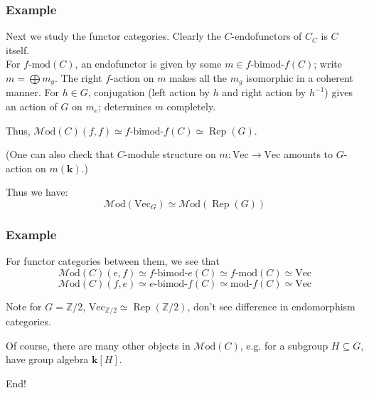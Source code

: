\documentclass{beamer}
\newcommand{\kk}{{\mathbf{k}}}
\newcommand{\ZZ}{{\mathbb{Z}}}
\DeclareMathOperator{\Rep}{Rep}
\newcommand{\inv}{{-1}} %
\newcommand{\Vect}{{\textrm{Vec}}}
\newcommand{\bimod}[2]{{#1\textrm{-bimod-}#2}}
\newcommand{\amod}[1]{{#1\textrm{-mod}}}
\newcommand{\moda}[1]{{\textrm{mod-}#1}}
\newcommand{\Mod}{{\mathcal{M}\textrm{od}}}
\newcommand{\ModA}[1]{{\Mod(#1)}}
\begin{document}
\begin{frame}
\frametitle{Example}

Next we study the functor categories.
Clearly the $C$-endofunctors of $C_C$ is $C$ itself.
\\
\pause
For $\amod{f}(C)$,
an endofunctor is given by some $m \in \bimod{f}{f}(C)$;
write $m = \bigoplus m_g$.
\pause
The right $f$-action on $m$ makes all the $m_g$ isomorphic
in a coherent manner.
\pause
For $h \in G$, conjugation (left action by $h$ and right action
by $h^\inv$) gives an action of $G$ on $m_e$;
determines $m$ completely.

\pause
Thus, $\ModA{C}(f,f) \simeq \bimod{f}{f}(C) \simeq \Rep(G)$.

\pause
(One can also check that $C$-module structure on
$m: \Vect \to \Vect$
amounts to $G$-action on $m(\kk)$.)

Thus we have:
\[
\ModA{\Vect_G} \simeq \ModA{\Rep(G)}
\]

\end{frame}

\begin{frame}
\frametitle{Example}

For functor categories between them, we see that
\[
\ModA{C}(e,f) \simeq \bimod{f}{e}(C) \simeq \amod{f}(C)
\simeq \Vect
\]
\[
\ModA{C}(f,e) \simeq \bimod{e}{f}(C) \simeq \moda{f}(C)
\simeq \Vect
\]

\pause
Note for $G = \ZZ/2$,
$\Vect_{\ZZ/2} \simeq \Rep(\ZZ/2)$,
don't see difference in endomorphism categories.

\pause
Of course, there are many other objects in $\ModA{C}$,
e.g. for a subgroup $H \subseteq G$,
have group algebra $\kk[H]$.

\end{frame}

\begin{frame}

\begin{center}
\Huge End!
\end{center}

\end{frame}
\end{document}
